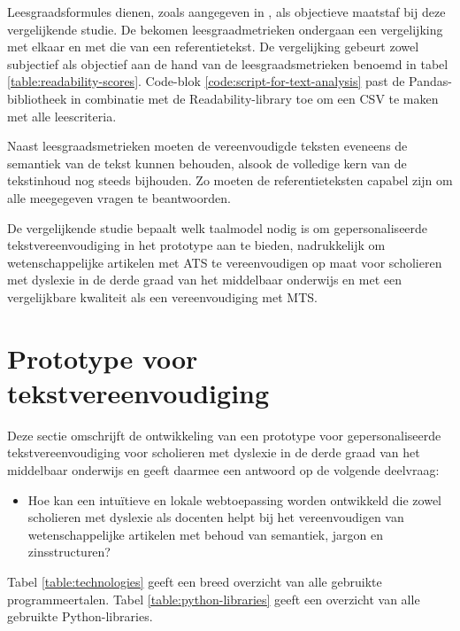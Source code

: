 Leesgraadsformules dienen, zoals aangegeven in \textcite{Nenkova2004}, als objectieve maatstaf bij deze vergelijkende studie. De bekomen leesgraadmetrieken ondergaan een vergelijking met elkaar en met die van een referentietekst. De vergelijking gebeurt zowel subjectief als objectief aan de hand van de leesgraadsmetrieken benoemd in tabel \ref{table:readability-scores}. Code-blok \ref{code:script-for-text-analysis} past de Pandas-bibliotheek in combinatie met de Readability-library toe om een CSV te maken met alle leescriteria.

\medspace

Naast leesgraadsmetrieken moeten de vereenvoudigde teksten eveneens de semantiek van de tekst kunnen behouden, alsook de volledige kern van de tekstinhoud nog steeds bijhouden. Zo moeten de referentieteksten capabel zijn om alle meegegeven vragen te beantwoorden.

\medspace

De vergelijkende studie bepaalt welk taalmodel nodig is om gepersonaliseerde tekstvereenvoudiging in het prototype aan te bieden, nadrukkelijk om wetenschappelijke artikelen met ATS te vereenvoudigen op maat voor scholieren met dyslexie in de derde graad van het middelbaar onderwijs en met een vergelijkbare kwaliteit als een vereenvoudiging met MTS. 









\section{Prototype voor tekstvereenvoudiging}

Deze sectie omschrijft de ontwikkeling van een prototype voor gepersonaliseerde tekstvereenvoudiging voor scholieren met dyslexie in de derde graad van het middelbaar onderwijs en geeft daarmee een antwoord op de volgende deelvraag: 

\begin{itemize}
	\item Hoe kan een intuïtieve en lokale webtoepassing worden ontwikkeld die zowel scholieren met dyslexie als docenten helpt bij het vereenvoudigen van wetenschappelijke artikelen met behoud van semantiek, jargon en zinsstructuren?
\end{itemize}

\medspace

Tabel \ref{table:technologies} geeft een breed overzicht van alle gebruikte programmeertalen. Tabel \ref{table:python-libraries} geeft een overzicht van alle gebruikte Python-libraries.

